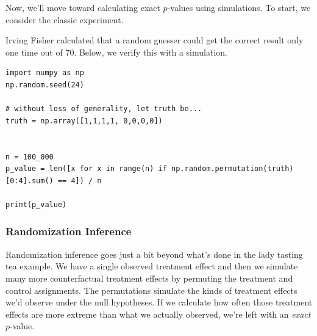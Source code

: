Now, we'll move toward calculating exact $p$-values using simulations. To start, we consider the classic  experiment. 

Irving Fisher calculated that a random guesser could get the correct result only one time out of 70. Below, we verify this with a simulation.

\begin{lstlisting}
import numpy as np
np.random.seed(24)

# without loss of generality, let truth be...
truth = np.array([1,1,1,1, 0,0,0,0])


n = 100_000
p_value = len([x for x in range(n) if np.random.permutation(truth)[0:4].sum() == 4]) / n

print(p_value)
\end{lstlisting}

\subsubsection{Randomization Inference}

Randomization inference goes just a bit beyond what's done in the lady tasting tea example. We have a single observed treatment effect and then we simulate many more counterfactual treatment effects by permuting the treatment and control assignments. The permutations simulate the kinds of treatment effects we'd observe under the null hypotheses. If we calculate how often those treatment effects are more extreme than what we actually observed, we're left with an \emph{exact} $p$-value. 


